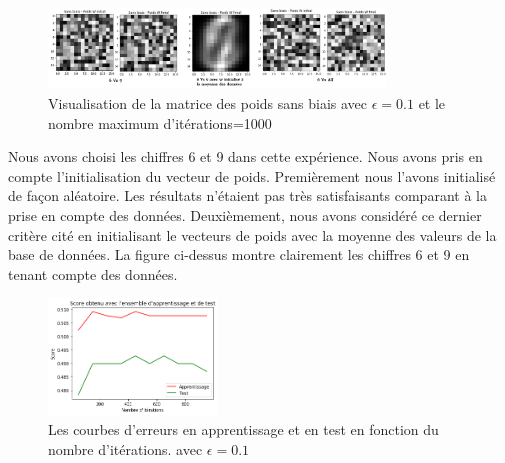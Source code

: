 \documentclass{report}
\begin{document}
\paragraph{}
 \begin{figure}[H]
	\begin{center}
		\includegraphics[width=0.8\textwidth]{6717.png}
		\caption{Visualisation de la matrice des poids sans biais avec $\epsilon=0.1$ et le nombre maximum d'itérations=1000}
	\end{center}
\end{figure}
Nous avons choisi les chiffres 6 et 9 dans cette expérience. Nous avons pris en compte l'initialisation du vecteur de poids. Premièrement nous l'avons initialisé de façon aléatoire. Les résultats n'étaient pas très satisfaisants comparant à la prise en compte des données. Deuxièmement, nous avons considéré ce dernier critère cité en initialisant le vecteurs de poids avec la moyenne des valeurs de la base de données. La figure ci-dessus montre clairement les chiffres 6 et 9 en tenant compte des données.
 \begin{figure}[H]
	\begin{center}
		\includegraphics[width=0.4\textwidth]{69_steps.png}
		\caption{Les courbes d’erreurs en apprentissage et en test en fonction du nombre d’itérations.  avec $\epsilon=0.1$ }
	\end{center}
\end{figure}
\end{document}
